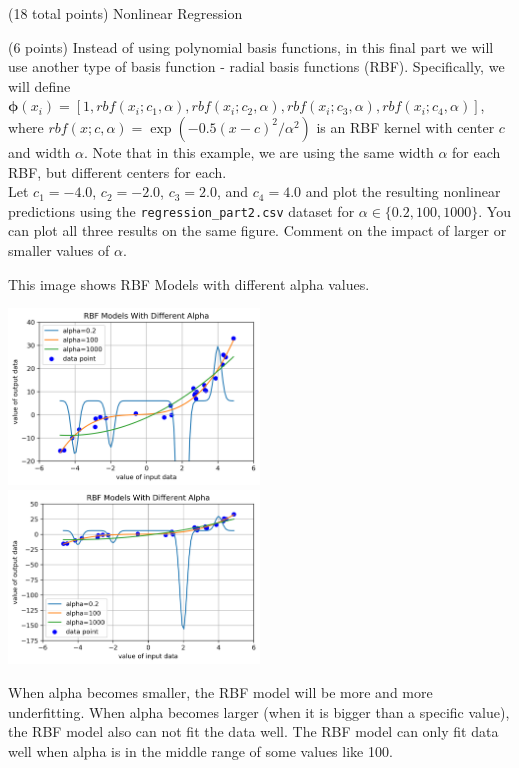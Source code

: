 \documentclass[12pt]{article}
\begin{document}
\begin{question}{(18 total points) Nonlinear Regression}
\begin{subquestion}
\end{subquestion}



%
%
\begin{subquestion}{(6 points) Instead of using polynomial basis functions, in this final part we will use another type of basis function - radial basis functions (RBF). 
Specifically, we will define $\boldsymbol{\phi}(x_i) = [1, rbf(x_i; c_1, \alpha), rbf(x_i; c_2, \alpha), rbf(x_i; c_3, \alpha), rbf(x_i; c_4, \alpha)]$, where $rbf(x; c, \alpha) =  \exp(-0.5(x-c)^2 / \alpha^2)$ is an RBF kernel with center $c$ and width $\alpha$. Note that in this example, we are using the same width $\alpha$ for each RBF, but different centers for each.\\ 
Let $c_1=-4.0$, $c_2=-2.0$, $c_3=2.0$, and $c_4=4.0$ and plot the resulting nonlinear predictions using the \texttt{regression\_part2.csv} dataset for $\alpha \in \{0.2, 100, 1000\}$. 
You can plot all three results on the same figure.
Comment on the impact of larger or smaller values of $\alpha$.
}


\begin{answerbox}{35em}
This image shows RBF Models with different alpha values.
\begin{center}
\includegraphics[width=0.5\textwidth]{RBF.png}
\includegraphics[width=0.5\textwidth]{RBF_1.png}
\end{center}
When alpha becomes smaller, the RBF model will be more and more underfitting. When alpha becomes larger (when it is bigger than a specific value), the RBF model also can not fit the data well. The RBF model can only fit data well when alpha is in the middle range of some values like 100.
\end{answerbox}



\end{subquestion}



\end{question}
\end{document}
